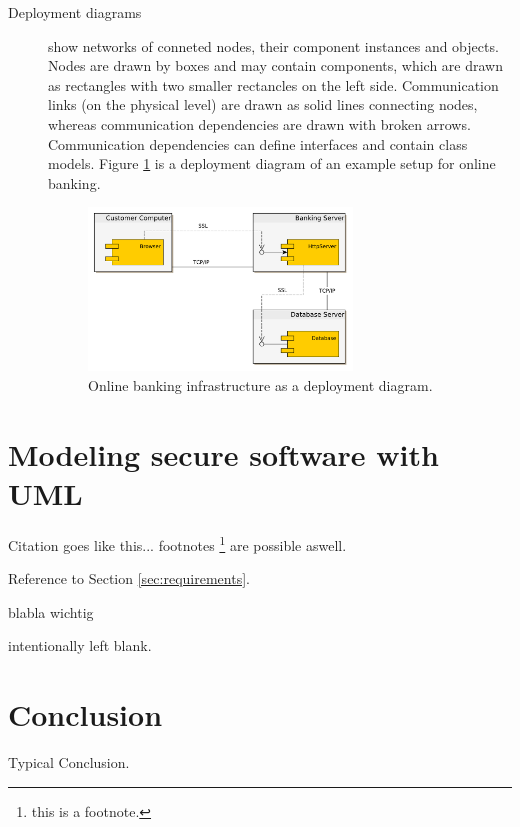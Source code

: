 \documentclass{acmtog} %
\begin{document}
\begin{description}
	\item[Deployment diagrams] show networks of conneted nodes, their component instances and objects.
	Nodes are drawn by boxes and may contain components, which are drawn as rectangles with two smaller rectancles on the left side.
	Communication links (on the physical level) are drawn as solid lines connecting nodes, whereas communication dependencies are drawn with broken arrows.
	Communication dependencies can define interfaces and contain class models.
	Figure \ref{fig:deployment-diagram} is a deployment diagram of an example setup for online banking.
	\begin{figure}[ht]
		\centerline{\includegraphics[width=7cm]{img/uml-banking/deployment-diagram}}
		\caption{Online banking infrastructure as a deployment diagram.}
		\label{fig:deployment-diagram}
	\end{figure}
\end{description}

\section{Modeling secure software with UML}
\label{sec:umlsec}

Citation goes like this... \cite{SHRB11}
footnotes \footnote{this is a footnote.} are possible aswell.

Reference to Section \ref{sec:requirements}.

blabla wichtig

intentionally left blank.

\section{Conclusion}
\label{sec:conclusion}

Typical Conclusion.
\end{document}
